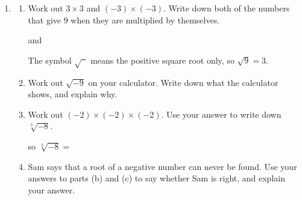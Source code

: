 \documentclass[12pt,a4paper]{article}
\begin{document}
\begin{enumerate}[resume]

\item
\begin{enumerate}
  \item Work out $3\times3$ and $(-3)\times(-3)$. Write down both of the
        numbers that give $9$ when they are multiplied by themselves.

\vspace{8pt}
 \hspace{1.5em} and \hspace{1.5em} 

\vspace{6pt}
The symbol $\sqrt{\phantom{a}}$ means the positive square root only, so
$\sqrt{9}=3$.

\vspace{6pt}
  \item Work out $\sqrt{-9}$ on your calculator. Write down what the calculator
        shows, and explain why.

\vspace{6pt}

\vspace{16pt}

\vspace{6pt}
  \item Work out $(-2)\times(-2)\times(-2)$. Use your answer to write down
        $\sqrt[3]{-8}$.

\vspace{8pt}
 \hspace{1.5em} so \hspace{1.5em} $\sqrt[3]{-8}=$ 

\vspace{6pt}
  \item Sam says that a root of a negative number can never be found. Use your
        answers to parts (b) and (c) to say whether Sam is right, and explain
        your answer.

\vspace{6pt}

\vspace{16pt}


\end{enumerate}
\end{enumerate}
\end{document}
